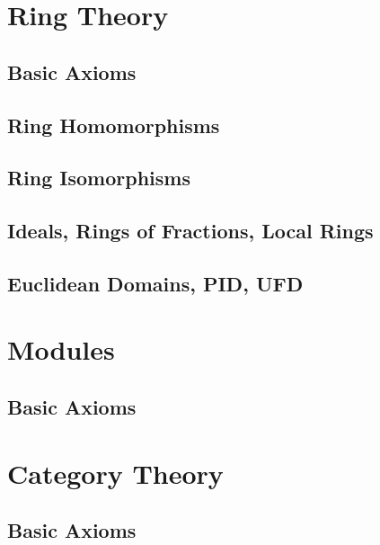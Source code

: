 \documentclass[a4paper,sfsidenotes,openany]{tufte-book}
\theoremstyle{definition}
\begin{document}
\chapter{Ring Theory}
\begin{fullwidth}
\section{Basic Axioms}

\section{Ring Homomorphisms}

\section{Ring Isomorphisms}

\section{Ideals, Rings of Fractions, Local Rings}

\section{Euclidean Domains, PID, UFD}

\end{fullwidth}

\newpage

\chapter{Modules}
\begin{fullwidth}
\section{Basic Axioms}

\end{fullwidth}

\newpage

\chapter{Category Theory}
\begin{fullwidth}
\section{Basic Axioms}

\end{fullwidth}

\newpage

\printindex
\end{document}
